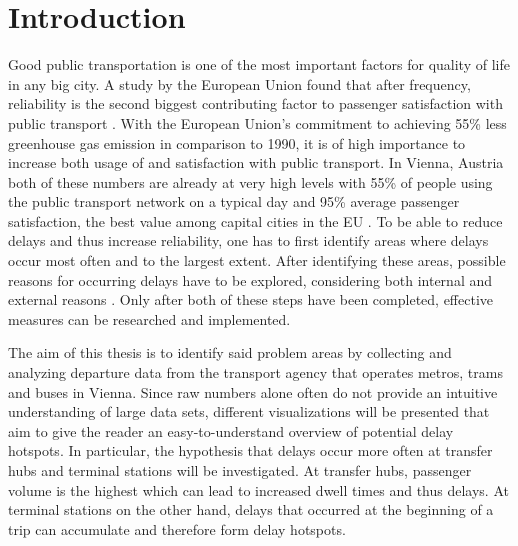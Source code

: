 \section{Introduction}

Good public transportation is one of the most important factors for quality of life in any big city. A study by the European Union found that after frequency, reliability is the second biggest contributing factor to passenger satisfaction with public transport \autocite[66]{eu-2020}. With the European Union's commitment to achieving 55\% less greenhouse gas emission in comparison to 1990, it is of high importance to increase both usage of and satisfaction with public transport. In Vienna, Austria both of these numbers are already at very high levels with 55\% of people using the public transport network on a typical day and 95\% average passenger satisfaction, the best value among capital cities in the EU \autocite[61]{eu-2020}. To be able to reduce delays and thus increase reliability, one has to first identify areas where delays occur most often and to the largest extent. After identifying these areas, possible reasons for occurring delays have to be explored, considering both internal and external reasons \autocite[372]{van-oort-2015}. Only after both of these steps have been completed, effective measures can be researched and implemented.

The aim of this thesis is to identify said problem areas by collecting and analyzing departure data from the transport agency that operates metros, trams and buses in Vienna. Since raw numbers alone often do not provide an intuitive understanding of large data sets, different visualizations will be presented that aim to give the reader an easy-to-understand overview of potential delay hotspots. In particular, the hypothesis that delays occur more often at transfer hubs and terminal stations will be investigated. At transfer hubs, passenger volume is the highest which can lead to increased dwell times and thus delays. At terminal stations on the other hand, delays that occurred at the beginning of a trip can accumulate and therefore form delay hotspots.

